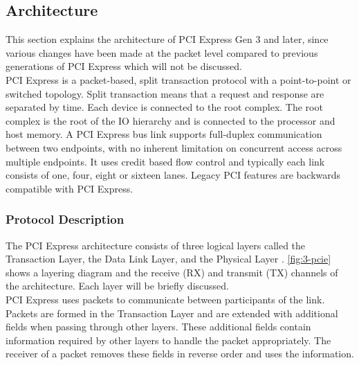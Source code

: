 


\subsection{Architecture}
This section explains the architecture of PCI Express Gen 3 and later, since various changes have been made at the packet level compared to previous generations of PCI Express which will not be discussed.\\
PCI Express is a packet-based, split transaction protocol with a point-to-point or switched topology. Split transaction means that a request and response are separated by time. Each device is connected to the root complex. The root complex is the root of the IO hierarchy and is connected to the processor and host memory. A PCI Express bus link supports full-duplex communication between two endpoints, with no inherent limitation on concurrent access across multiple endpoints. It uses credit based flow control and typically each link consists of one, four, eight or sixteen lanes. Legacy PCI features are backwards compatible with PCI Express.



\subsubsection{Protocol Description}
The PCI Express architecture consists of three logical layers called the Transaction Layer, the Data Link Layer, and the Physical Layer \cite{pcie-intel}. \autoref{fig:3-pcie} shows a layering diagram and the receive (RX) and transmit (TX) channels of the architecture. Each layer will be briefly discussed.\\
PCI Express uses packets to communicate between participants of the link. Packets are formed in the Transaction Layer and are extended with additional fields when passing through other layers. These additional fields contain information required by other layers to handle the packet appropriately. The receiver of a packet removes these fields in reverse order and uses the information.

